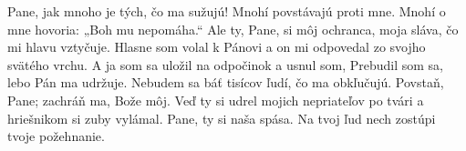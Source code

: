 Pane, jak mnoho je tých, čo ma sužujú!
Mnohí povstávajú proti mne.
\versseparator
Mnohí o mne hovoria:
„Boh mu nepomáha.“
\versseparator
Ale ty, Pane, si môj ochranca,
moja sláva, čo mi hlavu vztyčuje.
\versseparator
Hlasne som volal k Pánovi
a on mi odpovedal zo svojho svätého vrchu.
\versseparator
A ja som sa uložil na odpočinok a usnul som,
Prebudil som sa, lebo Pán ma udržuje.
\versseparator
Nebudem sa báť tisícov ľudí, čo ma obkľučujú.
Povstaň, Pane; zachráň ma, Bože môj.
\versseparator
Veď ty si udrel mojich nepriateľov po tvári
a hriešnikom si zuby vylámal.
\versseparator
Pane, ty si naša spása.
Na tvoj ľud nech zostúpi tvoje požehnanie.
